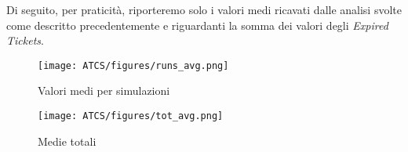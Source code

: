 \documentclass[../Relazione.tex]{subfiles}
\begin{document}
         Di seguito, per praticità, riporteremo solo i valori medi ricavati dalle analisi svolte come descritto precedentemente e riguardanti la somma dei valori degli \textit{Expired Tickets}.
         
         \begin{figure}[!h]
             \centering
             \texttt{[image: ATCS/figures/runs\_avg.png]}
             \caption{Valori medi per simulazioni}
             \label{fig:runs_avg}
         \end{figure}
         \begin{figure}[!h]
             \centering
             \texttt{[image: ATCS/figures/tot\_avg.png]}
             \caption{Medie totali}
             \label{fig:tot_avg}
         \end{figure}
         
\end{document}
